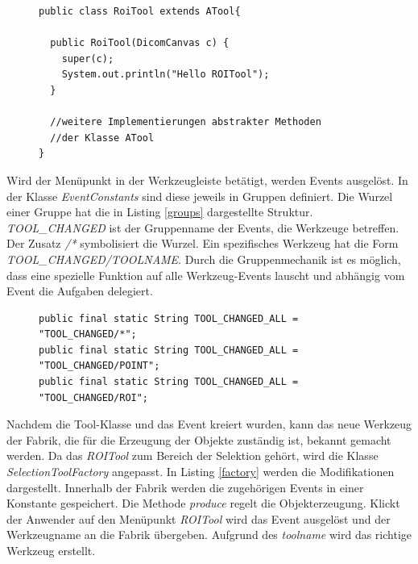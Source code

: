 \begin{figure}[htbp]
\begin{lstlisting}[frame=leftline]
public class RoiTool extends ATool{

  public RoiTool(DicomCanvas c) {
    super(c);
    System.out.println("Hello ROITool");
  }
  
  //weitere Implementierungen abstrakter Methoden
  //der Klasse ATool
}
\end{lstlisting}
\end{figure}

Wird der Menüpunkt in der Werkzeugleiste betätigt, werden Events ausgelöst. In der Klasse \textit{EventConstants} sind diese jeweils in Gruppen definiert. Die Wurzel einer Gruppe hat die in Listing \ref{groups} dargestellte Struktur. \textit{TOOL\_CHANGED} ist der Gruppenname der Events, die Werkzeuge betreffen. Der Zusatz \textit{/*} symbolisiert die Wurzel. Ein spezifisches Werkzeug hat die Form \textit{TOOL\_CHANGED/TOOLNAME}. Durch die Gruppenmechanik ist es möglich, dass eine spezielle Funktion auf alle Werkzeug-Events lauscht und abhängig vom Event die Aufgaben delegiert.

\begin{figure}[htbp]
\begin{lstlisting}[frame=leftline]
public final static String TOOL_CHANGED_ALL = "TOOL_CHANGED/*";
public final static String TOOL_CHANGED_ALL = "TOOL_CHANGED/POINT";
public final static String TOOL_CHANGED_ALL = "TOOL_CHANGED/ROI";
\end{lstlisting}
\end{figure}

Nachdem die Tool-Klasse und das Event kreiert wurden, kann das neue Werkzeug der Fabrik, die für die Erzeugung der Objekte zuständig ist, bekannt gemacht werden. Da das \textit{ROITool} zum Bereich der Selektion gehört, wird die Klasse \textit{SelectionToolFactory} angepasst. In Listing \ref{factory} werden die Modifikationen dargestellt. Innerhalb der Fabrik werden die zugehörigen Events in einer Konstante gespeichert. Die Methode \textit{produce} regelt die Objekterzeugung. Klickt der Anwender auf den Menüpunkt \textit{ROITool} wird das Event ausgelöst und der Werkzeugname an die Fabrik übergeben. Aufgrund des \textit{toolname} wird das richtige Werkzeug erstellt.

